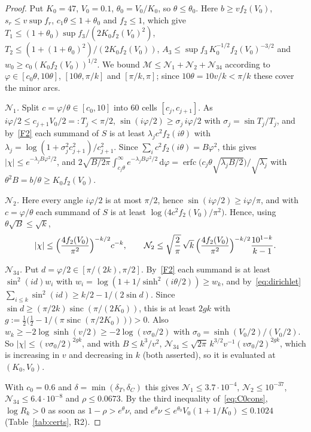 \documentclass[11pt]{amsart}
\theoremstyle{definition}
\theoremstyle{remark}
\numberwithin{equation}{section}
\newcommand{\erfc}{\operatorname{erfc}}
\newcommand{\sinc}{\operatorname{sinc}}
\newcommand{\dd}{\,\mathrm{d}}
\begin{document}
\begin{proof}
Put $K_0=47$, $V_0=0.1$, $\theta_0=V_0/K_0$, so $\theta\le\theta_0$. Here $b\ge vf_2(V_0)$, $s_r\le v\sup f_r$, $c_1\theta\le1+\theta_0$ and
$f_2\le1$, which give $T_1\le(1+\theta_0)\sup f_3/(2K_0f_2(V_0)^2)$, $T_2\le(1+(1+\theta_0)^2)/(2K_0f_2(V_0))$,
$A_3\le\sup f_3\,K_0^{-1/2}f_2(V_0)^{-3/2}$ and $w_0\ge c_0(K_0f_2(V_0))^{1/2}$. We bound $\mathcal M\le\mathcal N_1+\mathcal N_2+\mathcal N_{34}$
according to $\varphi\in[c_0\theta,10\theta]$, $[10\theta,\pi/k]$ and $[\pi/k,\pi]$; since $10\theta=10v/k<\pi/k$ these cover the minor arcs.

\emph{$\mathcal N_1$.} Split $c=\varphi/\theta\in[c_0,10]$ into $60$ cells $[c_j,c_{j+1}]$. As $i\varphi/2\le c_{j+1}V_0/2=:T_j<\pi/2$,
$\sin(i\varphi/2)\ge\sigma_j\,i\varphi/2$ with $\sigma_j=\sin T_j/T_j$, and by~\ref{F2} each summand of $S$ is at least
$\lambda_jc^2f_2(i\theta)$ with $\lambda_j=\log(1+\sigma_j^2c_{j+1}^2)/c_{j+1}^2$. Since $\sum_ic^2f_2(i\theta)=B\varphi^2$, this gives
$|\chi|\le e^{-\lambda_jB\varphi^2/2}$, and
$2\sqrt{B/2\pi}\int_{c_j\theta}^\infty e^{-\lambda_jB\varphi^2/2}\dd\varphi=\erfc\bigl(c_j\theta\sqrt{\lambda_jB/2}\bigr)/\sqrt{\lambda_j}$ with
$\theta^2B=b/\theta\ge K_0f_2(V_0)$.

\emph{$\mathcal N_2$.} Here every angle $i\varphi/2$ is at most $\pi/2$, hence $\sin(i\varphi/2)\ge i\varphi/\pi$, and with
$c=\varphi/\theta$ each summand of $S$ is at least $\log\bigl(4c^2f_2(V_0)/\pi^2\bigr)$. Hence, using $\theta\sqrt B\le\sqrt k$,
\[
  |\chi|\le\Bigl(\frac{4f_2(V_0)}{\pi^2}\Bigr)^{-k/2}c^{-k},\qquad
  \mathcal N_2\le\sqrt{\frac2\pi}\,\sqrt k\,\Bigl(\frac{4f_2(V_0)}{\pi^2}\Bigr)^{-k/2}\frac{10^{1-k}}{k-1}.
\]

\emph{$\mathcal N_{34}$.} Put $d=\varphi/2\in[\pi/(2k),\pi/2]$. By~\ref{F2} each summand is at least $\sin^2(id)w_i$ with
$w_i=\log(1+1/\sinh^2(i\theta/2))\ge w_k$, and by~\eqref{eq:dirichlet} $\sum_{i\le k}\sin^2(id)\ge k/2-1/(2\sin d)$. Since
$\sin d\ge(\pi/2k)\sinc(\pi/(2K_0))$, this is at least $2gk$ with $g:=\frac12\bigl(\frac12-1/(\pi\sinc(\pi/2K_0))\bigr)>0$. Also
$w_k\ge-2\log\sinh(v/2)\ge-2\log(v\sigma_0/2)$ with $\sigma_0=\sinh(V_0/2)/(V_0/2)$. So $|\chi|\le(v\sigma_0/2)^{2gk}$, and with
$B\le k^3/v^2$, $\mathcal N_{34}\le\sqrt{2\pi}\,k^{3/2}v^{-1}(v\sigma_0/2)^{2gk}$, which is increasing in $v$ and decreasing in $k$ (both
asserted), so it is evaluated at $(K_0,V_0)$.

With $c_0=0.6$ and $\delta=\min(\delta_T,\delta_C)$ this gives $\mathcal N_1\le3.7\cdot10^{-4}$, $\mathcal N_2\le10^{-37}$,
$\mathcal N_{34}\le6.4\cdot10^{-8}$ and $\rho\le0.0673$. By the third inequality of~\eqref{eq:C0cons}, $\log R_k>0$ as soon as
$1-\rho>e^\theta\nu$, and $e^\theta\nu\le e^{\theta_0}V_0(1+1/K_0)\le0.1024$ (Table~\ref{tab:certs}, R2).
\end{proof}
\end{document}
